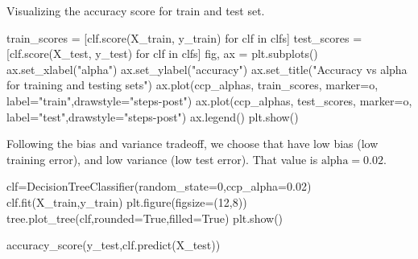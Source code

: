 \documentclass[
  letterpaper,
  DIV=11,
  numbers=noendperiod]{scrartcl}
\newenvironment{Shaded}{\begin{snugshade}}{\end{snugshade}}
\newcommand{\ControlFlowTok}[1]{\textcolor[rgb]{0.00,0.23,0.31}{#1}}
\newcommand{\DecValTok}[1]{\textcolor[rgb]{0.68,0.00,0.00}{#1}}
\newcommand{\FloatTok}[1]{\textcolor[rgb]{0.68,0.00,0.00}{#1}}
\newcommand{\KeywordTok}[1]{\textcolor[rgb]{0.00,0.23,0.31}{#1}}
\newcommand{\NormalTok}[1]{\textcolor[rgb]{0.00,0.23,0.31}{#1}}
\newcommand{\OperatorTok}[1]{\textcolor[rgb]{0.37,0.37,0.37}{#1}}
\newcommand{\StringTok}[1]{\textcolor[rgb]{0.13,0.47,0.30}{#1}}
\newcommand{\VariableTok}[1]{\textcolor[rgb]{0.07,0.07,0.07}{#1}}
\begin{document}
Visualizing the accuracy score for train and test set.

\begin{Shaded}
\begin{Highlighting}[]
\NormalTok{train\_scores }\OperatorTok{=}\NormalTok{ [clf.score(X\_train, y\_train) }\ControlFlowTok{for}\NormalTok{ clf }\KeywordTok{in}\NormalTok{ clfs]}
\NormalTok{test\_scores }\OperatorTok{=}\NormalTok{ [clf.score(X\_test, y\_test) }\ControlFlowTok{for}\NormalTok{ clf }\KeywordTok{in}\NormalTok{ clfs]}
\NormalTok{fig, ax }\OperatorTok{=}\NormalTok{ plt.subplots()}
\NormalTok{ax.set\_xlabel(}\StringTok{"alpha"}\NormalTok{)}
\NormalTok{ax.set\_ylabel(}\StringTok{"accuracy"}\NormalTok{)}
\NormalTok{ax.set\_title(}\StringTok{"Accuracy vs alpha for training and testing sets"}\NormalTok{)}
\NormalTok{ax.plot(ccp\_alphas, train\_scores, marker}\OperatorTok{=}\StringTok{\textquotesingle{}o\textquotesingle{}}\NormalTok{, label}\OperatorTok{=}\StringTok{"train"}\NormalTok{,drawstyle}\OperatorTok{=}\StringTok{"steps{-}post"}\NormalTok{)}
\NormalTok{ax.plot(ccp\_alphas, test\_scores, marker}\OperatorTok{=}\StringTok{\textquotesingle{}o\textquotesingle{}}\NormalTok{, label}\OperatorTok{=}\StringTok{"test"}\NormalTok{,drawstyle}\OperatorTok{=}\StringTok{"steps{-}post"}\NormalTok{)}
\NormalTok{ax.legend()}
\NormalTok{plt.show()}
\end{Highlighting}
\end{Shaded}

Following the bias and variance tradeoff, we choose that have low bias
(low training error), and low variance (low test error). That value is
\(\text{alpha} = 0.02\).

\begin{Shaded}
\begin{Highlighting}[]
\NormalTok{clf}\OperatorTok{=}\NormalTok{DecisionTreeClassifier(random\_state}\OperatorTok{=}\DecValTok{0}\NormalTok{,ccp\_alpha}\OperatorTok{=}\FloatTok{0.02}\NormalTok{)}
\NormalTok{clf.fit(X\_train,y\_train)}
\NormalTok{plt.figure(figsize}\OperatorTok{=}\NormalTok{(}\DecValTok{12}\NormalTok{,}\DecValTok{8}\NormalTok{))}
\NormalTok{tree.plot\_tree(clf,rounded}\OperatorTok{=}\VariableTok{True}\NormalTok{,filled}\OperatorTok{=}\VariableTok{True}\NormalTok{)}
\NormalTok{plt.show()}
\end{Highlighting}
\end{Shaded}

\begin{Shaded}
\begin{Highlighting}[]
\NormalTok{accuracy\_score(y\_test,clf.predict(X\_test))}
\end{Highlighting}
\end{Shaded}
\end{document}
